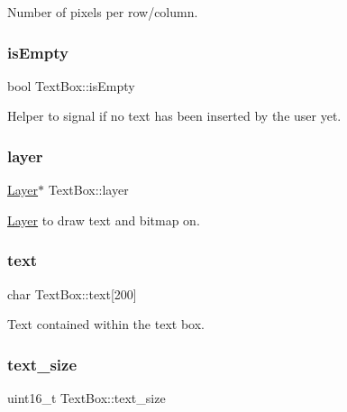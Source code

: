 Number of pixels per row/column. 

\mbox{\label{group__textbox_gad8bde595ae368fa4850cb6c05d153957}} 
\subsubsection{\texorpdfstring{is\+Empty}{isEmpty}}
{\footnotesize\ttfamily bool Text\+Box\+::is\+Empty}



Helper to signal if no text has been inserted by the user yet. 

\mbox{\label{group__textbox_ga6e30e306c0894a9cd95ffe51fa878c5f}} 
\subsubsection{\texorpdfstring{layer}{layer}}
{\footnotesize\ttfamily \mbox{\hyperlink{struct_layer}{Layer}}$\ast$ Text\+Box\+::layer}



\mbox{\hyperlink{struct_layer}{Layer}} to draw text and bitmap on. 

\mbox{\label{group__textbox_ga103b4d17950a13af1b186c09809567a3}} 
\subsubsection{\texorpdfstring{text}{text}}
{\footnotesize\ttfamily char Text\+Box\+::text\mbox{[}200\mbox{]}}



Text contained within the text box. 

\mbox{\label{group__textbox_ga5c78afd9fd951002d6b87a3cfffe27b8}} 
\subsubsection{\texorpdfstring{text\+\_\+size}{text\_size}}
{\footnotesize\ttfamily uint16\+\_\+t Text\+Box\+::text\+\_\+size}



